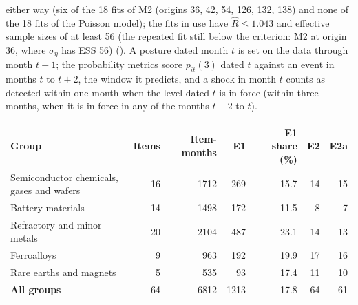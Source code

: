 either way (six of the 18 fits of M2 (origins 36, 42, 54, 126, 132, 138) and none of the 18 fits of the Poisson model); the fits in use have $\widehat{R} \leq 1.043$ and effective sample sizes of at least 56 (the repeated fit still below the criterion: M2 at origin 36, where $\sigma_\eta$ has ESS 56) (). A posture dated month $t$ is set on the data through month $t-1$; the probability metrics score $p_{it}(3)$ dated $t$ against an event in months $t$ to $t+2$, the window it predicts, and a shock in month $t$ counts as detected within one month when the level dated $t$ is in force (within three months, when it is in force in any of the months $t-2$ to $t$).

\noindent\begin{minipage}{\linewidth}
\label{tab:S25_1}
\centering\scriptsize
\begin{tabular}{lrrrrrr}
\toprule
Group & Items & Item-months & E1 & E1 share (\%) & E2 & E2a \\ \midrule
Semiconductor chemicals, gases and wafers & 16 & 1712 & 269 & 15.7 & 14 & 15 \\
Battery materials & 14 & 1498 & 172 & 11.5 & 8 & 7 \\
Refractory and minor metals & 20 & 2104 & 487 & 23.1 & 14 & 13 \\
Ferroalloys & 9 & 963 & 192 & 19.9 & 17 & 16 \\
Rare earths and magnets & 5 & 535 & 93 & 17.4 & 11 & 10 \\
\textbf{All groups} & 64 & 6812 & 1213 & 17.8 & 64 & 61 \\
\bottomrule
\end{tabular}
\end{minipage}
\vspace{14pt}

